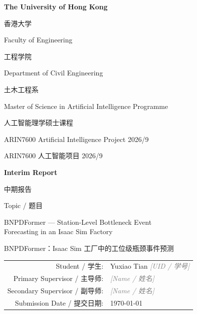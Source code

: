 \documentclass[12pt,a4paper,oneside,scheme=plain]{ctexrep}
\newcommand{\fillinline}[2]{\textit{\textcolor{gray}{[#1 / #2]}}}
\begin{document}
\hypersetup{pageanchor=false}
\begin{titlepage}
\thispagestyle{empty}
\centering
\vspace*{1.2cm}
{\Large\bfseries The University of Hong Kong\par}
{\large 香港大学\par}
\vspace{0.40cm}
{\large Faculty of Engineering\par}
{\normalsize 工程学院\par}
\vspace{0.18cm}
{\large Department of Civil Engineering\par}
{\normalsize 土木工程系\par}
\vspace{0.45cm}
{\large Master of Science in Artificial Intelligence Programme\par}
{\normalsize 人工智能理学硕士课程\par}
\vspace{0.70cm}
{\large ARIN7600 Artificial Intelligence Project 2026/9\par}
{\normalsize ARIN7600 人工智能项目 2026/9\par}
\vspace{0.95cm}
{\LARGE\bfseries Interim Report\par}
{\Large 中期报告\par}
\vspace{1.15cm}
{\large Topic / 题目\par}
\vspace{0.25cm}
{\large BNPDFormer --- Station-Level Bottleneck Event\\[0.15em]
Forecasting in an Isaac Sim Factory\par}
\vspace{0.25cm}
{\normalsize BNPDFormer：Isaac Sim 工厂中的工位级瓶颈事件预测\par}
\vspace{1.35cm}

\begin{tabular}{rl}
Student / 学生: & Yuxiao Tian \fillinline{UID}{学号} \\[0.50em]
Primary Supervisor / 主导师: & \fillinline{Name}{姓名} \\[0.50em]
Secondary Supervisor / 副导师: & \fillinline{Name}{姓名} \\[0.50em]
Submission Date / 提交日期: & \today \\
\end{tabular}

\vfill
\end{titlepage}
\hypersetup{pageanchor=true}
\end{document}
